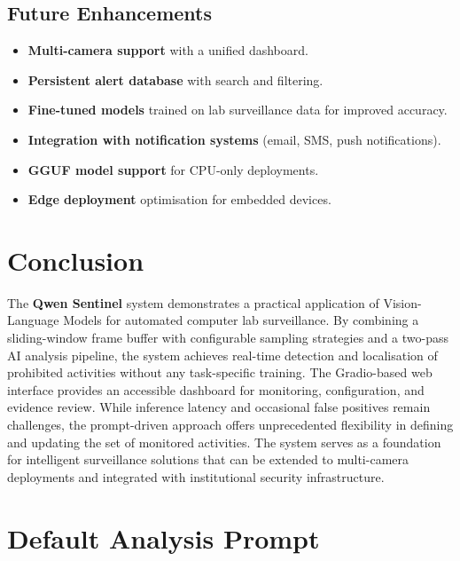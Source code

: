\documentclass[12pt,a4paper]{article}
\begin{document}
\subsection{Future Enhancements}

\begin{itemize}
    \item \textbf{Multi-camera support} with a unified dashboard.
    \item \textbf{Persistent alert database} with search and filtering.
    \item \textbf{Fine-tuned models} trained on lab surveillance data for improved accuracy.
    \item \textbf{Integration with notification systems} (email, SMS, push notifications).
    \item \textbf{GGUF model support} for CPU-only deployments.
    \item \textbf{Edge deployment} optimisation for embedded devices.
\end{itemize}

\section{Conclusion}

The \textbf{Qwen Sentinel} system demonstrates a practical application of Vision-Language Models for automated computer lab surveillance. By combining a sliding-window frame buffer with configurable sampling strategies and a two-pass AI analysis pipeline, the system achieves real-time detection and localisation of prohibited activities without any task-specific training. The Gradio-based web interface provides an accessible dashboard for monitoring, configuration, and evidence review. While inference latency and occasional false positives remain challenges, the prompt-driven approach offers unprecedented flexibility in defining and updating the set of monitored activities. The system serves as a foundation for intelligent surveillance solutions that can be extended to multi-camera deployments and integrated with institutional security infrastructure.

\appendix
\section{Default Analysis Prompt}
\label{app:prompt}
\end{document}
